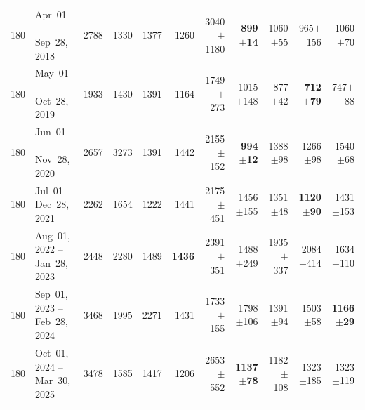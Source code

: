 \begin{longtable}{r l r r r r r r r r r}
180 & Apr~01 -- Sep~28, 2018 & 2788 & 1330 & 1377 & 1260 & 3040{\tiny$\pm$1180} & \textbf{899{\tiny$\pm$14}} & 1060{\tiny$\pm$55} & 965{\tiny$\pm$156} & 1060{\tiny$\pm$70} \\
180 & May~01 -- Oct~28, 2019 & 1933 & 1430 & 1391 & 1164 & 1749{\tiny$\pm$273} & 1015{\tiny$\pm$148} & 877{\tiny$\pm$42} & \textbf{712{\tiny$\pm$79}} & 747{\tiny$\pm$88} \\
180 & Jun~01 -- Nov~28, 2020 & 2657 & 3273 & 1391 & 1442 & 2155{\tiny$\pm$152} & \textbf{994{\tiny$\pm$12}} & 1388{\tiny$\pm$98} & 1266{\tiny$\pm$98} & 1540{\tiny$\pm$68} \\
180 & Jul~01 -- Dec~28, 2021 & 2262 & 1654 & 1222 & 1441 & 2175{\tiny$\pm$451} & 1456{\tiny$\pm$155} & 1351{\tiny$\pm$48} & \textbf{1120{\tiny$\pm$90}} & 1431{\tiny$\pm$153} \\
180 & Aug~01, 2022 -- Jan~28, 2023 & 2448 & 2280 & 1489 & \textbf{1436} & 2391{\tiny$\pm$351} & 1488{\tiny$\pm$249} & 1935{\tiny$\pm$337} & 2084{\tiny$\pm$414} & 1634{\tiny$\pm$110} \\
180 & Sep~01, 2023 -- Feb~28, 2024 & 3468 & 1995 & 2271 & 1431 & 1733{\tiny$\pm$155} & 1798{\tiny$\pm$106} & 1391{\tiny$\pm$94} & 1503{\tiny$\pm$58} & \textbf{1166{\tiny$\pm$29}} \\
180 & Oct~01, 2024 -- Mar~30, 2025 & 3478 & 1585 & 1417 & 1206 & 2653{\tiny$\pm$552} & \textbf{1137{\tiny$\pm$78}} & 1182{\tiny$\pm$108} & 1323{\tiny$\pm$185} & 1323{\tiny$\pm$119} \\
\end{longtable}
\endgroup



